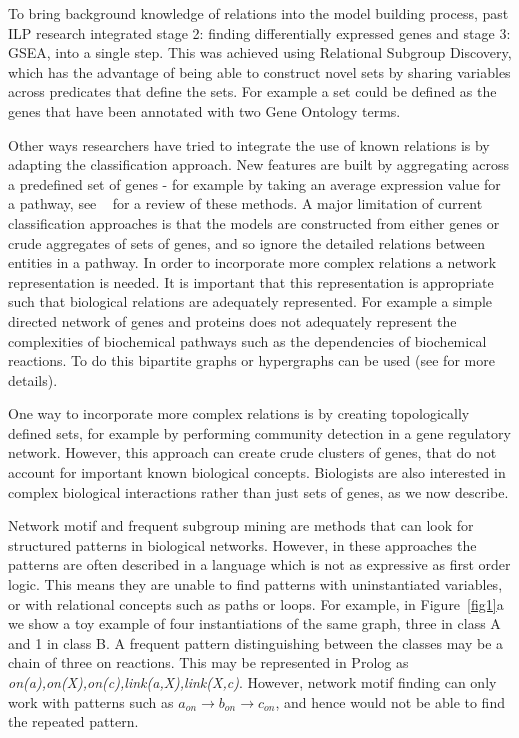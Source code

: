 \documentclass[runningheads,a4paper]{llncs}
\begin{document}
To bring background knowledge of relations into the model building process, past ILP research \citep{gamberger_induction_2004} integrated stage 2: finding differentially expressed genes and stage 3: GSEA, into a single step. This was achieved using Relational Subgroup Discovery, which has the advantage of being able to construct novel sets by sharing variables across predicates that define the sets. For example a set could be defined as the genes that have been annotated with two Gene Ontology terms.  

Other ways researchers have tried to integrate the use of known relations is by adapting the classification approach. New features are built by aggregating across a predefined set of genes - for example by taking an average expression value for a pathway, see ~\citep{holec_comparative_2012} for a review of these methods.
A major limitation of current classification approaches is that the models are constructed from either genes or crude aggregates of sets of genes, and so ignore the detailed relations between entities in a pathway. 
In order to incorporate more complex relations a network representation is needed.
It is important that this representation is appropriate such that biological relations are adequately represented.
For example a simple directed network of genes and proteins does not adequately represent the complexities of biochemical pathways such as the dependencies of biochemical reactions. To do this bipartite graphs or hypergraphs can be used (see \citep{whelan2011representation} for more details). 

One way to incorporate more complex relations is by creating topologically defined sets, for example by performing community detection in a gene regulatory network.
However, this approach can create crude clusters of genes, that do not account for important known biological concepts.
Biologists are also interested in complex biological interactions rather than just sets of genes, as we now describe. 


Network motif and frequent subgroup mining  \citep{kim_biological_2011} are methods that can look for structured patterns in biological networks. However, in these approaches the patterns are often described in a language which is not as expressive as first order logic. This means they are unable to find patterns with uninstantiated variables, or with relational concepts such as paths or loops.
For example, in Figure~\ref{fig1}a we show a toy example of four instantiations of the same graph, three in class A and 1 in class B.
A frequent pattern distinguishing between the classes may be a chain of three on reactions. 
This may be represented in Prolog as \emph{on(a),on(X),on(c),link(a,X),link(X,c)}. However, 
network motif finding can only work with  patterns such as \emph{$a_{on} \rightarrow b_{on} \rightarrow c_{on}$}, and hence would not be able to find the repeated pattern. 
\end{document}
